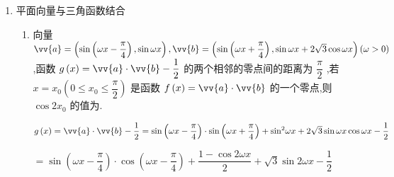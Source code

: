 \begin{enumerate}
\begin{enumerate}
\begin{jieda}
\begin{enumerate}
                ${\left| AC\right| }^{2} = {x}^{2} + {n}^{2}{x}^{2} - {2n}{x}^{2}\cos \dfrac{2\pi }{3} = \left( {{n}^{2} + n + 1}\right) {x}^{2},$

                ${\left| BC\right| }^{2} = {m}^{2}{x}^{2} + {n}^{2}{x}^{2} - {2mn}{x}^{2}\cos \dfrac{2\pi }{3} = \left( {{m}^{2} + {n}^{2} + {mn}}\right) {x}^{2}$ ,

                相加得 ${\left| AC\right| }^{2} + {\left| AB\right| }^{2} = {\left| BC\right| }^{2}$ ,得 $\left( {{n}^{2} + n + 1}\right) {x}^{2} + \left( {{m}^{2} + m + 1}\right) {x}^{2} = \left( {{m}^{2} + {n}^{2} + {mn}}\right) {x}^{2}$，整理得 $m + n + 2 = {mn}$ 
                
                由 $\left| {PB}\right|  + \left| {PC}\right|  = {2t}\left| {PA}\right|$ ,得 $m + n = {2t}$

                于是 $m + n + 2 = {mn} \leq  {\left( \dfrac{m + n}{2}\right) }^{2}$（当且仅当 $m = n$ ,即 $m = n = 1 + \sqrt{3}$ 时取等号），即${t}^{2} - {2t} - 2 \geq  0$ ,而 $t > 0$ ,解得 $t \geq  1 + \sqrt{3}$ ,所以实数 $t$ 的最小值为 $1 + \sqrt{3}$ .
            \end{enumerate}
        \end{jieda}
    \end{enumerate}

    \item 平面向量与三角函数结合
    \begin{enumerate}
        \item 向量 $\vv{a} = \left( {\sin \left( {{\omega x} - \dfrac{\pi }{4}}\right) ,\sin {\omega x}}\right) ,\vv{b} = \left( {\sin \left( {{\omega x} + \dfrac{\pi }{4}}\right) ,\sin {\omega x} + 2\sqrt{3}\cos {\omega x}}\right) \left( {\omega  > 0}\right)$ ,函数 $g\left( x\right)  = \vv{a} \cdot  \vv{b} - \dfrac{1}{2}$ 的两个相邻的零点间的距离为 $\dfrac{\pi }{2}$ ,若 $x = {x}_{0}\left( {0 \leq  {x}_{0} \leq  \dfrac{\pi }{2}}\right)$ 是函数 $f\left( x\right)  = \vv{a} \cdot  \vv{b}$ 的一个零点,则 $\cos 2{x}_{0}$ 的值为.
        \begin{jieda}
            $g\left( x\right)  = \vv{a} \cdot  \vv{b} - \dfrac{1}{2} = \sin \left( {{\omega x} - \dfrac{\pi }{4}}\right)  \cdot  \sin \left( {{\omega x} + \dfrac{\pi }{4}}\right)  + {\sin }^{2}{\omega x} + 2\sqrt{3}\sin {\omega x}\cos {\omega x} - \dfrac{1}{2}$
            
            $= \sin \left( {{\omega x} - \dfrac{\pi }{4}}\right)  \cdot  \cos \left( {{\omega x} - \dfrac{\pi }{4}}\right)  + \dfrac{1 - \cos {2\omega x}}{2} + \sqrt{3}\sin {2\omega x} - \dfrac{1}{2}$
            

\end{jieda}
\end{enumerate}
\end{enumerate}
